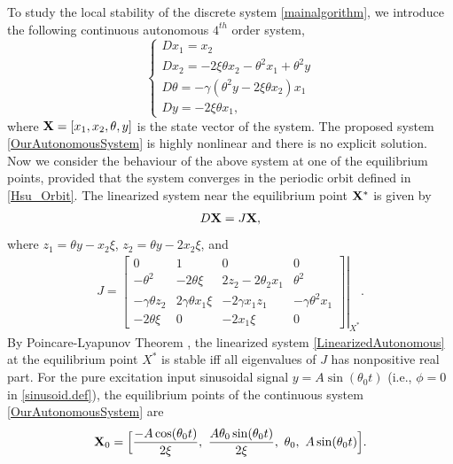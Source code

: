 \documentclass{UCF_ETD}
\begin{document}
To study the local stability of the  discrete system \eqref{mainalgorithm}, we introduce the following
continuous autonomous $4^{th}$ order system,
\begin{equation} \label{OurAutonomousSystem}
\left\{\begin{array}{l}
 Dx_1 %
= x_2 \\
 Dx_2  %
= -2\xi\theta x_2-\theta^2x_1+ \theta^2 y   \\
 D\theta  %
= -\gamma(\theta^2y -2\xi\theta x_2)x_1  \\
 Dy  %
= -2\xi \theta x_1,
\end{array}\right.
\end{equation}
where ${\bf X} = [x_1,x_2,\theta,y]$ is the state vector of the system.
The proposed system  \eqref{OurAutonomousSystem} is highly nonlinear and there is no explicit  solution.
Now we consider the behaviour of the above system at one of the equilibrium points,
provided that the system converges in the periodic orbit defined in \eqref{Hsu_Orbit}.
The linearized system near the equilibrium point ${\bf X}^*$ is given by
\begin{eqnarray}\label{LinearizedAutonomous}
D{\bf X} = J {\bf X},
\end{eqnarray}
where    $z_1=\theta y - x_2\xi$, $z_2=\theta y - 2 x_2 \xi$, and
\begin{eqnarray} \label{OurJacobianMat}
J =\left. \begin{bmatrix}
    0 & 1 & 0 & 0 \\
    -\theta^2 & -2\theta\xi & 2z_2 - 2\theta_2 x_1  &  \theta^2 \\
    -\gamma\theta z_2 & 2\gamma \theta x_1\xi & -2\gamma x_1 z_1  &  -\gamma \theta^2 x_1 \\
    -2\theta\xi & 0 & -2 x_1\xi & 0
\end{bmatrix}\right|_{X^*}.
\end{eqnarray}
 By Poincare-Lyapunov Theorem \cite{khalil02},  the linearized system \eqref{LinearizedAutonomous}
   at the equilibrium point $X^*$  is stable iff all eigenvalues of $J$ has nonpositive real part.
   For the pure excitation input sinusoidal signal $y = A \sin(\theta_0 t)$ (i.e., $\phi=0$ in  \eqref{sinusoid.def}),
  the equilibrium points of the continuous system \eqref{OurAutonomousSystem} are
   \begin{equation}\label{X0.def1}
{\bf X}_0 = \Big[\frac{-A \cos(\theta_0 t)}{2\xi},\ \frac{A\theta_0\sin (\theta_0 t)}{2\xi}, \ \theta_0,\  A\sin(\theta_0 t) \Big ].
\end{equation}
\end{document}
